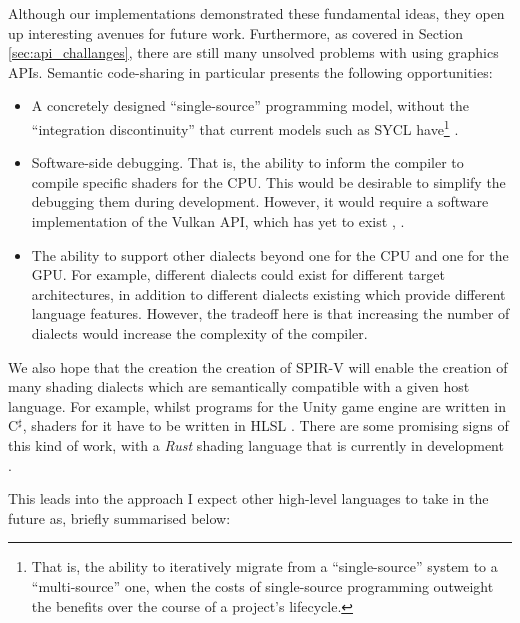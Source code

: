 \documentclass[a4paper,12pt,twoside,openright]{report}
\begin{document}
Although our implementations demonstrated these fundamental ideas, they open up
interesting avenues for future work. Furthermore, as covered in Section
\ref{sec:api_challanges}, there are still many unsolved problems with using
graphics APIs. Semantic code-sharing in particular presents the following
opportunities:

\begin{itemize}

    \item A concretely designed ``single-source'' programming model, without
    the ``integration discontinuity'' that current models such as SYCL
    have\footnote{That is, the ability to iteratively migrate from a
    ``single-source'' system to a ``multi-source'' one, when the costs of
    single-source programming outweight the benefits over the course of a
    project's lifecycle.} \cite{DesignAndEvaluateReusableComponents}.

    \item Software-side debugging. That is, the ability to inform the compiler
    to compile specific shaders for the CPU. This would be desirable to
    simplify the debugging them during development. However, it would require a
    software implementation of the Vulkan API, which has yet to exist
    \cite{VulkanCPU} \cite{Kazan}, \cite{SwiftShaderVulkan}.

    \item The ability to support other dialects beyond one for the CPU and one
    for the GPU. For example, different dialects could exist for different
    target architectures, in addition to different dialects existing which
    provide different language features. However, the tradeoff here is that
    increasing the number of dialects would increase the complexity of the
    compiler.

\end{itemize}

We also hope that the creation the creation of SPIR-V will enable the creation
of many shading dialects which are semantically compatible with a given host
language. For example, whilst programs for the Unity game engine are written in
C$^\sharp$, shaders for it have to be written in HLSL \cite{UnityShaders}.
There are some promising signs of this kind of work, with a \textit{Rust}
shading language that is currently in development \cite{RLSL}.

This leads into the approach I expect other high-level languages to take in the
future as, briefly summarised below:
\end{document}
